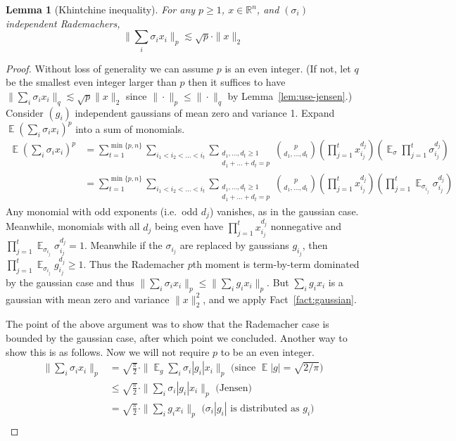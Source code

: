 \documentclass[11pt]{article}
\DeclareMathOperator*{\E}{\mathbb{E}}
\newcommand{\R}{\mathbb{R}}
\newtheorem{lemma}[theorem]{Lemma}
\begin{document}
\begin{lemma}[Khintchine inequality]
For any $p\ge 1$, $x\in\R^n$, and $(\sigma_i)$ independent Rademachers,
$$
\|\sum_i \sigma_i x_i\|_p \lesssim \sqrt{p}\cdot \|x\|_2
$$
\end{lemma}
\begin{proof}
  Without loss of generality we can assume $p$ is an even integer. (If not, let $q$ be the smallest even integer larger than $p$ then it suffices to have $\|\sum_i \sigma_i x_i\|_q \lesssim \sqrt{p}\|x\|_2$ since $\|\cdot\|_p \le \|\cdot\|_q$ by Lemma~\ref{lem:use-jensen}.) Consider $(g_i)$ independent gaussians of mean zero and variance 1. Expand $\E (\sum_i \sigma_i x_i)^p$ into a sum of monomials. 
\begin{align*}
\E (\sum_i \sigma_i x_i)^p &= \sum_{t=1}^{\min\{p,n\}} \sum_{i_1<i_2<\ldots<i_t} \sum_{\substack{d_1,\ldots,d_t\ge 1\\d_1+\ldots+d_t = p}} \binom{p}{d_1,\ldots,d_t} \left(\prod_{j=1}^t x_{i_j}^{d_j}\right)\left(\E_\sigma \prod_{j=1}^t \sigma_{i_j}^{d_j} \right)\\
{}&=\sum_{t=1}^{\min\{p,n\}} \sum_{i_1<i_2<\ldots<i_t} \sum_{\substack{d_1,\ldots,d_t\ge 1\\d_1+\ldots+d_t = p}} \binom{p}{d_1,\ldots,d_t} \left(\prod_{j=1}^t x_{i_j}^{d_j}\right)\left(\prod_{j=1}^t \E_{\sigma_{i_j}} \sigma_{i_j}^{d_j} \right)
\end{align*}
Any monomial with odd exponents (i.e.\ odd $d_j$) vanishes, as in the gaussian case. Meanwhile, monomials with all $d_j$ being even have $\prod_{j=1}^t x_{i_j}^{d_j}$ nonnegative and $\prod_{j=1}^t \E_{\sigma_{i_j}} \sigma_{i_j}^{d_j} = 1$. Meanwhile if the $\sigma_{i_j}$ are replaced by gaussians $g_{i_j}$, then $\prod_{j=1}^t \E_{\sigma_{i_j}} g_{i_j}^{d_j} \ge 1$. Thus the Rademacher $p$th moment is term-by-term dominated by the gaussian case and thus $\|\sum_i \sigma_i x_i\|_p \le \|\sum_i g_i x_i\|_p$. But $\sum_i g_i x_i$ is a gaussian with mean zero and variance $\|x\|_2^2$, and we apply Fact~\ref{fact:gaussian}.

The point of the above argument was to show that the Rademacher case is bounded by the gaussian case, after which point we concluded. Another way to show this is as follows. Now we will not require $p$ to be an even integer.
\begin{align*}
\|\sum_i \sigma_i x_i\|_p &= \sqrt{\frac{\pi}2}\cdot\|\E_g \sum_i \sigma_i |g_i| x_i\|_p\text{ (since }\E|g| = \sqrt{2/\pi}\text{)}\\
{}&\le \sqrt{\frac{\pi}2}\cdot\|\sum_i \sigma_i |g_i| x_i\|_p\text{ (Jensen)}\\
{}&= \sqrt{\frac{\pi}2}\cdot\|\sum_i g_i x_i\|_p\text{ (}\sigma_i|g_i|\text{ is distributed as }g_i\text{)}\\
\end{align*}
\end{proof}
\end{document}
